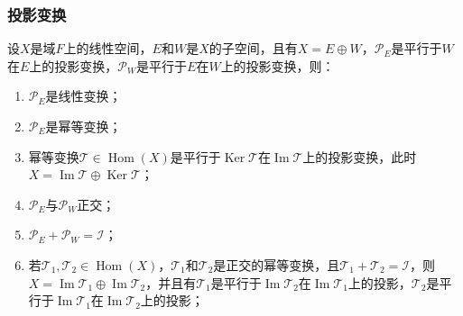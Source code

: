 \subsubsection{投影变换}
\begin{property}\label{prop:ProjectionTransformation}
	设$X$是域$F$上的线性空间，$E$和$W$是$X$的子空间，且有$X=E\oplus W$，$\mathcal{P}_E$是平行于$W$在$E$上的投影变换，$\mathcal{P}_W$是平行于$E$在$W$上的投影变换，则：
	\begin{enumerate}
		\item $\mathcal{P}_E$是线性变换；
		\item $\mathcal{P}_E$是幂等变换；
		\item 幂等变换$\mathcal{T}\in\operatorname{Hom}(X)$是平行于$\operatorname{Ker}\mathcal{T}$在$\operatorname{Im}\mathcal{T}$上的投影变换，此时$X=\operatorname{Im}\mathcal{T}\oplus\operatorname{Ker}\mathcal{T}$；
		\item $\mathcal{P}_E$与$\mathcal{P}_W$正交；
		\item $\mathcal{P}_E+\mathcal{P}_W=\mathcal{I}$；
		\item 若$\mathcal{T}_1,\mathcal{T}_2\in\operatorname{Hom}(X)$，$\mathcal{T}_1$和$\mathcal{T}_2$是正交的幂等变换，且$\mathcal{T}_1+\mathcal{T}_2=\mathcal{I}$，则$X=\operatorname{Im}\mathcal{T}_1\oplus\operatorname{Im}\mathcal{T}_2$，并且有$\mathcal{T}_1$是平行于$\operatorname{Im}\mathcal{T}_2$在$\operatorname{Im}\mathcal{T}_1$上的投影，$\mathcal{T}_2$是平行于$\operatorname{Im}\mathcal{T}_1$在$\operatorname{Im}\mathcal{T}_2$上的投影；
	\end{enumerate}
\end{property}
